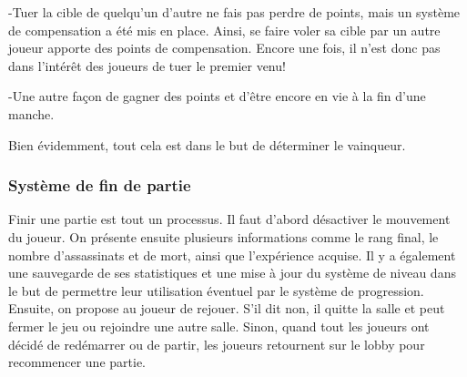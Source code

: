 	-Tuer la cible de quelqu'un d'autre ne fais pas perdre de points, mais un système de compensation a été mis en place. Ainsi, se 	faire voler sa cible par un autre joueur apporte des points de compensation. Encore une fois, il n'est donc pas dans l'intérêt 
	des joueurs de tuer le premier venu!

	-Une autre façon de gagner des points et d'être encore en vie à la fin d'une manche.

    Bien évidemment, tout cela est dans le but de déterminer le vainqueur.
	
\subsubsection{Système de fin de partie}
	Finir une partie est tout un processus. Il faut d'abord désactiver le mouvement du joueur.
	On présente ensuite plusieurs informations comme le rang final, le nombre d'assassinats
	et de mort, ainsi que l'expérience acquise. Il y a également une sauvegarde de ses statistiques et une mise à jour du système
	de niveau dans le but de permettre leur utilisation éventuel par le système de progression.
	Ensuite, on propose au joueur de rejouer. S'il dit non, il quitte la salle et peut fermer le jeu ou rejoindre une autre salle.
	Sinon, quand tout les joueurs ont décidé de redémarrer ou de partir, les joueurs retournent 
	sur le lobby pour recommencer une partie.
